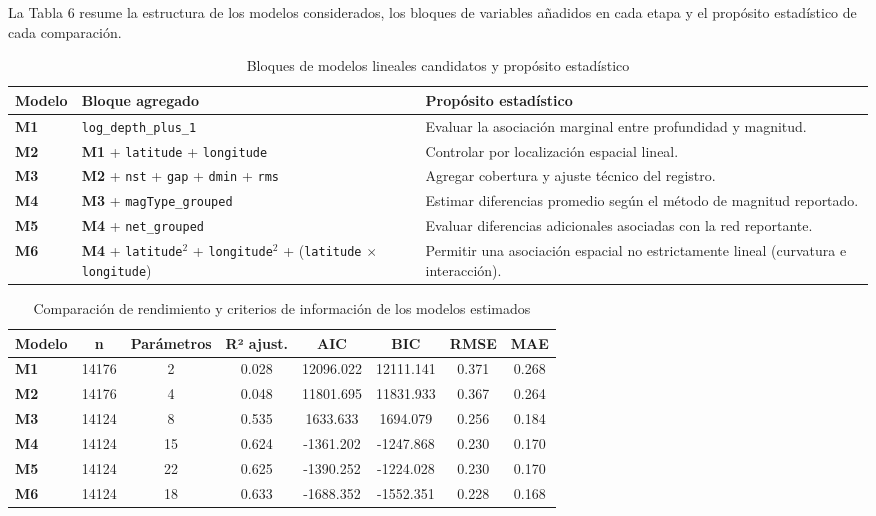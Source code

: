 \documentclass{style}
\newcommand{\var}[1]{\texttt{#1}}
\newcommand{\reporttablesize}{\footnotesize}
\begin{document}
La Tabla 6 resume la estructura de los modelos considerados, los bloques de variables añadidos en cada etapa y el propósito estadístico de cada comparación.


\begin{table}[H]
    \centering
    \caption{Bloques de modelos lineales candidatos y propósito estadístico}
    \label{tab:bloques_modelos}
    \scriptsize
    \begin{tabularx}{\textwidth}{llX}
    \toprule
    \textbf{Modelo} & \textbf{Bloque agregado} & \textbf{Propósito estadístico} \\
    \midrule
    \textbf{M1} & \var{log\_depth\_plus\_1} & Evaluar la asociación marginal entre profundidad y magnitud. \\
    \textbf{M2} & \textbf{M1} + \var{latitude} + \var{longitude} & Controlar por localización espacial lineal. \\
    \textbf{M3} & \textbf{M2} + \var{nst} + \var{gap} + \var{dmin} + \var{rms} & Agregar cobertura y ajuste técnico del registro. \\
    \textbf{M4} & \textbf{M3} + \var{magType\_grouped} & Estimar diferencias promedio según el método de magnitud reportado. \\
    \textbf{M5} & \textbf{M4} + \var{net\_grouped} & Evaluar diferencias adicionales asociadas con la red reportante. \\
    \textbf{M6} & \textbf{M4} + \var{latitude}$^2$ + \var{longitude}$^2$ + (\var{latitude} $\times$ \var{longitude}) & Permitir una asociación espacial no estrictamente lineal (curvatura e interacción). \\
    \bottomrule
    \end{tabularx}
\end{table}


\begin{table}[H]
    \centering
    \caption{Comparación de rendimiento y criterios de información de los modelos estimados}
    \scriptsize
    \setlength{\tabcolsep}{12pt} 
    \begin{tabular}{lccccccc}
    \toprule
    \textbf{Modelo} & \textbf{n} & \textbf{Parámetros} & \textbf{R² ajust.} & \textbf{AIC} & \textbf{BIC} & \textbf{RMSE} & \textbf{MAE} \\
    \midrule
    \textbf{M1} & 14176 & 2  & 0.028 & 12096.022 & 12111.141 & 0.371 & 0.268 \\
    \textbf{M2} & 14176 & 4  & 0.048 & 11801.695 & 11831.933 & 0.367 & 0.264 \\
    \textbf{M3} & 14124 & 8  & 0.535 & 1633.633  & 1694.079  & 0.256 & 0.184 \\
    \textbf{M4} & 14124 & 15 & 0.624 & -1361.202 & -1247.868 & 0.230 & 0.170 \\
    \textbf{M5} & 14124 & 22 & 0.625 & -1390.252 & -1224.028 & 0.230 & 0.170 \\
    \textbf{M6} & 14124 & 18 & 0.633 & -1688.352 & -1552.351 & 0.228 & 0.168 \\
    \bottomrule
    \end{tabular}
\end{table}
\end{document}
